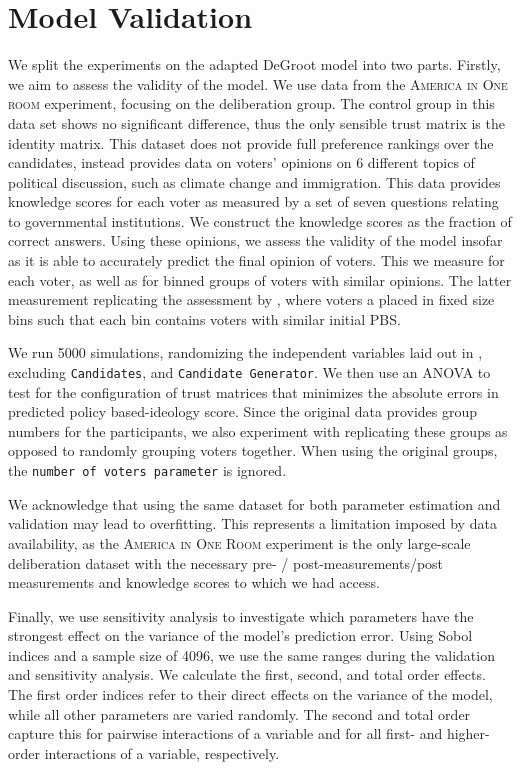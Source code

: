 \section{Model Validation}

We split the experiments on the adapted DeGroot model into two parts. Firstly,
we aim to assess the validity of the model. We use data from the
\textsc{America in One room} experiment, focusing on the deliberation group.
The control group in this data set shows no significant difference, thus the
only sensible trust matrix is the identity matrix. This dataset does not
provide full preference rankings over the candidates, instead provides data on
voters' opinions on 6 different topics of political discussion, such as climate
change and immigration. This data provides knowledge scores for each voter as
measured by a set of seven questions relating to governmental institutions. We
construct the knowledge scores as the fraction of correct answers. Using these
opinions, we assess the validity of the model insofar as it is able to
accurately predict the final opinion of voters. This we measure for each voter,
as well as for binned groups of voters with similar opinions. The latter
measurement replicating the assessment by
\citet{fishkinCanDeliberationHave2024}, where voters a placed in fixed size bins such that each bin contains voters with similar initial PBS.

We run 5000 simulations, randomizing the independent variables laid out in
, excluding \texttt{Candidates}, and
\texttt{Candidate Generator}. We then use an ANOVA to test for the
configuration of trust matrices that minimizes the absolute errors in predicted
policy based-ideology score. Since the original data provides group numbers for
the participants, we also experiment with
replicating these groups as opposed to randomly grouping voters together. When
using the original groups, the \texttt{number of voters parameter} is ignored.

We acknowledge that using the same dataset for both parameter estimation and
validation may lead to overfitting. This represents a limitation imposed by
data availability, as the \textsc{America in One Room} experiment is the only
large-scale deliberation dataset with the necessary pre- / post-measurements/post measurements and
knowledge scores to which we had access.





Finally, we use sensitivity analysis to investigate which parameters have the
strongest effect on the variance of the model's prediction error. Using Sobol
indices and a sample size of 4096, we use the same ranges during the validation and sensitivity analysis. We calculate the first, second, and total
order effects. The first order indices refer to their direct effects on the
variance of the model, while all other parameters are varied randomly. The second and
total order capture this for pairwise interactions of a variable and for all
first- and higher-order interactions of a variable, respectively.


